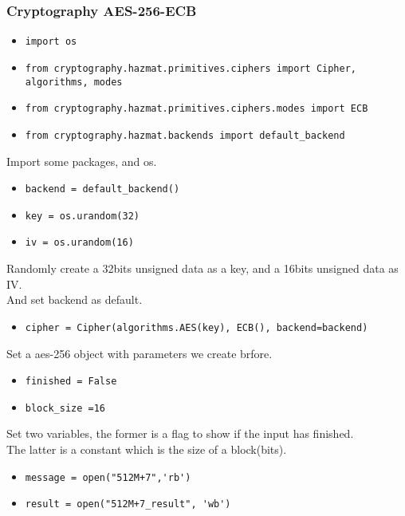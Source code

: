 \documentclass{article}
\begin{document}
\subsubsection{Cryptography AES-256-ECB}

\begin{itemize}
\item \verb|import os|
\item \verb|from cryptography.hazmat.primitives.ciphers import Cipher, algorithms, modes|
\item \verb|from cryptography.hazmat.primitives.ciphers.modes import ECB|
\item \verb|from cryptography.hazmat.backends import default_backend|
\end{itemize}

\noindent Import some packages, and os.

\begin{itemize}
\item \verb|backend = default_backend()|
\item \verb|key = os.urandom(32)|
\item \verb|iv = os.urandom(16)|
\end{itemize}

\noindent Randomly create a 32bits unsigned data as a key, and a 16bits unsigned data as IV.\\
And set backend as default.

\begin{itemize}
\item \verb|cipher = Cipher(algorithms.AES(key), ECB(), backend=backend)|
\end{itemize}

\noindent Set a aes-256 object with parameters we create brfore.

\begin{itemize}
\item \verb|finished = False|
\item \verb|block_size =16|
\end{itemize}

\noindent Set two variables, the former is a flag to show if the input has finished.\\
The latter is a constant which is the size of a block(bits).

\begin{itemize}
\item \verb|message = open("512M+7",'rb')|
\item \verb|result = open("512M+7_result", 'wb')|
\end{itemize}
 
\end{document}
